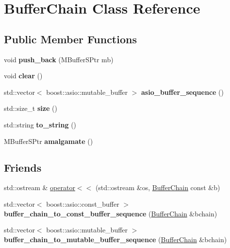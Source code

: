 \hypertarget{class_buffer_chain}{}\section{Buffer\+Chain Class Reference}
\label{class_buffer_chain}
\subsection*{Public Member Functions}
\begin{DoxyCompactItemize}
\item 
\mbox{\label{class_buffer_chain_a18cabe85c817f2d2fe71cef8796dc5aa}} 
void {\bfseries push\+\_\+back} (M\+Buffer\+S\+Ptr mb)
\item 
\mbox{\label{class_buffer_chain_a0d79bb22c88dc25967ffe4156d889564}} 
void {\bfseries clear} ()
\item 
\mbox{\label{class_buffer_chain_a1ac72f8fe63e67e3ab6c9fda557df723}} 
std\+::vector$<$ boost\+::asio\+::mutable\+\_\+buffer $>$ {\bfseries asio\+\_\+buffer\+\_\+sequence} ()
\item 
\mbox{\label{class_buffer_chain_af7b326120387e4d45820f1393457dbbf}} 
std\+::size\+\_\+t {\bfseries size} ()
\item 
\mbox{\label{class_buffer_chain_a8174da8c9bb38ec30a243161963a5438}} 
std\+::string {\bfseries to\+\_\+string} ()
\item 
\mbox{\label{class_buffer_chain_a2854bbd7379d04fd1b82b1ee59b8e1d9}} 
M\+Buffer\+S\+Ptr {\bfseries amalgamate} ()
\end{DoxyCompactItemize}
\subsection*{Friends}
\begin{DoxyCompactItemize}
\item 
std\+::ostream \& \hyperlink{class_buffer_chain_ae7312cff3464f8365e320c781578ea10}{operator$<$$<$} (std\+::ostream \&os, \hyperlink{class_buffer_chain}{Buffer\+Chain} const \&b)
\item 
\mbox{\label{class_buffer_chain_a1bcf6a64428ee17912c161fe5287be84}} 
std\+::vector$<$ boost\+::asio\+::const\+\_\+buffer $>$ {\bfseries buffer\+\_\+chain\+\_\+to\+\_\+const\+\_\+buffer\+\_\+sequence} (\hyperlink{class_buffer_chain}{Buffer\+Chain} \&bchain)
\item 
\mbox{\label{class_buffer_chain_af2cd978dcbbff1d71753e24e5506f243}} 
std\+::vector$<$ boost\+::asio\+::mutable\+\_\+buffer $>$ {\bfseries buffer\+\_\+chain\+\_\+to\+\_\+mutable\+\_\+buffer\+\_\+sequence} (\hyperlink{class_buffer_chain}{Buffer\+Chain} \&bchain)
\end{DoxyCompactItemize}


